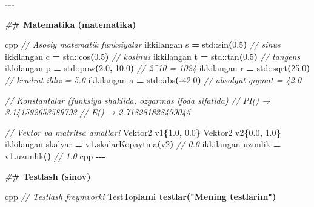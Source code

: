 \documentclass[a4paper,11pt,twoside,openright]{book}
\newenvironment{Shaded}{\begin{snugshade}}{\end{snugshade}}
\newcommand{\BuiltInTok}[1]{#1}
\newcommand{\CharTok}[1]{\textcolor[rgb]{0.31,0.60,0.02}{#1}}
\newcommand{\CommentTok}[1]{\textcolor[rgb]{0.56,0.35,0.01}{\textit{#1}}}
\newcommand{\ErrorTok}[1]{\textcolor[rgb]{0.64,0.00,0.00}{\textbf{#1}}}
\newcommand{\FloatTok}[1]{\textcolor[rgb]{0.00,0.00,0.81}{#1}}
\newcommand{\NormalTok}[1]{#1}
\newcommand{\OperatorTok}[1]{\textcolor[rgb]{0.81,0.36,0.00}{\textbf{#1}}}
\newcommand{\PreprocessorTok}[1]{\textcolor[rgb]{0.56,0.35,0.01}{\textit{#1}}}
\begin{document}
\begin{Shaded}
\begin{Highlighting}[]
\OperatorTok{{-}{-}{-}}

\PreprocessorTok{\#}\ErrorTok{\# Matematika (\textasciigrave{}matematika\textasciigrave{})}

\ErrorTok{\textasciigrave{}\textasciigrave{}\textasciigrave{}}\NormalTok{cpp}
\CommentTok{// Asosiy matematik funksiyalar}
\NormalTok{ikkilangan s }\OperatorTok{=} \BuiltInTok{std::}\NormalTok{sin}\OperatorTok{(}\FloatTok{0.5}\OperatorTok{)}         \CommentTok{// sinus}
\NormalTok{ikkilangan c }\OperatorTok{=} \BuiltInTok{std::}\NormalTok{cos}\OperatorTok{(}\FloatTok{0.5}\OperatorTok{)}         \CommentTok{// kosinus}
\NormalTok{ikkilangan t }\OperatorTok{=} \BuiltInTok{std::}\NormalTok{tan}\OperatorTok{(}\FloatTok{0.5}\OperatorTok{)}         \CommentTok{// tangens}
\NormalTok{ikkilangan p }\OperatorTok{=} \BuiltInTok{std::}\NormalTok{pow}\OperatorTok{(}\FloatTok{2.0}\OperatorTok{,} \FloatTok{10.0}\OperatorTok{)}   \CommentTok{// 2\^{}10 = 1024}
\NormalTok{ikkilangan r }\OperatorTok{=} \BuiltInTok{std::}\NormalTok{sqrt}\OperatorTok{(}\FloatTok{25.0}\OperatorTok{)}       \CommentTok{// kvadrat ildiz = 5.0}
\NormalTok{ikkilangan a }\OperatorTok{=} \BuiltInTok{std::}\NormalTok{abs}\OperatorTok{({-}}\FloatTok{42.0}\OperatorTok{)}       \CommentTok{// absolyut qiymat = 42.0}

\CommentTok{// Konstantalar (funksiya shaklida, o\textquotesingle{}zgarmas ifoda sifatida)}
\CommentTok{// PI() → 3.141592653589793}
\CommentTok{// E() → 2.718281828459045}

\CommentTok{// Vektor va matritsa amallari}
\NormalTok{Vektor2 v1}\OperatorTok{\{}\FloatTok{1.0}\OperatorTok{,} \FloatTok{0.0}\OperatorTok{\}}
\NormalTok{Vektor2 v2}\OperatorTok{\{}\FloatTok{0.0}\OperatorTok{,} \FloatTok{1.0}\OperatorTok{\}}
\NormalTok{ikkilangan skalyar }\OperatorTok{=}\NormalTok{ v1}\OperatorTok{.}\NormalTok{skalarKopaytma}\OperatorTok{(}\NormalTok{v2}\OperatorTok{)}   \CommentTok{// 0.0}
\NormalTok{ikkilangan uzunlik }\OperatorTok{=}\NormalTok{ v1}\OperatorTok{.}\NormalTok{uzunlik}\OperatorTok{()}             \CommentTok{// 1.0}
\ErrorTok{\textasciigrave{}\textasciigrave{}\textasciigrave{}}\NormalTok{cpp}
\OperatorTok{{-}{-}{-}}

\PreprocessorTok{\#}\ErrorTok{\# Testlash (\textasciigrave{}sinov\textasciigrave{})}

\ErrorTok{\textasciigrave{}\textasciigrave{}\textasciigrave{}}\NormalTok{cpp}
\CommentTok{// Testlash freymvorki}
\NormalTok{TestTo}\CharTok{\textquotesingle{}p}\ErrorTok{lami testlar("Mening testlarim")}


\end{Highlighting}
\end{Shaded}
\end{document}

